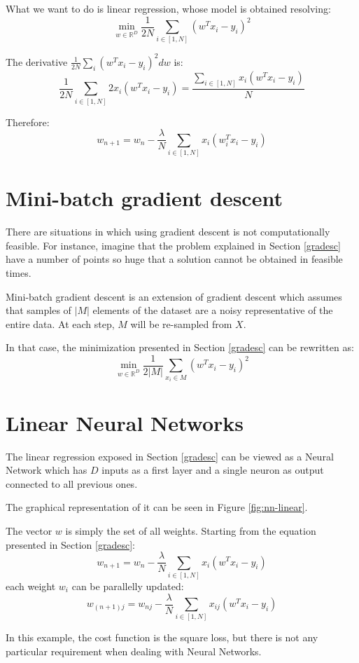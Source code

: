 What we want to do is linear regression, whose model is obtained resolving:
\[\displaystyle \min_{w \in \mathbb{R}^D} \frac{1}{2N} \sum_{i \in [1, N]} (w^T x_i - y_i)^2\]

The derivative  $\frac{1}{2N} \sum_i (w^T x_i - y_i)^2 dw$ is:
\[\frac{1}{2N} \sum_{i \in [1, N]} 2 x_i(w^T x_i - y_i) = \frac{\sum_{i \in [1, N]} x_i(w^T x_i - y_i)}{N}\]

Therefore:
\[ w_{n+1} = w_n - \frac{\lambda}{N} \sum_{i \in [1, N]} x_i(w_i^T x_i - y_i) \]


\section{Mini-batch gradient descent}
There are situations in which using gradient descent is not computationally feasible.
For instance, imagine that the problem explained in Section \ref{gradesc} have
a number of points so huge that a solution cannot be obtained in feasible times.

Mini-batch gradient descent is an extension of gradient descent which assumes that
samples of $|M|$ elements of the dataset are a noisy representative of the entire data.
At each step, $M$ will be re-sampled from $X$.

In that case, the minimization presented in Section \ref{gradesc} can be rewritten as:
\[\displaystyle \min_{w \in \mathbb{R}^D} \frac{1}{2|M|} \sum_{x_i \in M} (w^T x_i - y_i)^2 \]

\section{Linear Neural Networks}
The linear regression exposed in Section \ref{gradesc} can be viewed as a Neural Network
which has $D$ inputs as a first layer and a single neuron as output connected to all previous ones.

The graphical representation of it can be seen in Figure \ref{fig:nn-linear}.

The vector $w$ is simply the set of all weights.
Starting from the equation presented in Section \ref{gradesc}:
\[ w_{n+1} = w_n - \frac{\lambda}{N} \sum_{i \in [1, N]} x_i(w^T x_i - y_i) \]
each weight $w_i$ can be parallelly updated:
\[ w_{(n+1)j} = w_{nj} -  \frac{\lambda}{N} \sum_{i \in [1, N]} x_{ij}(w^T x_i - y_i) \]

In this example, the cost function is the square loss, but there is not any particular requirement when
dealing with Neural Networks.

